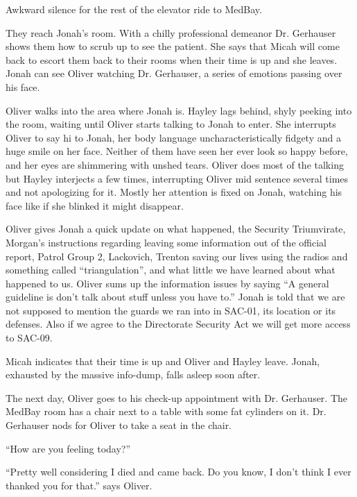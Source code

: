 Awkward silence for the rest of the elevator ride to MedBay.



They reach Jonah's room.  With a chilly professional demeanor Dr. Gerhauser shows them how to scrub up to see the patient.  She says that Micah will come back to escort them back to their rooms when their time is up and she leaves.  Jonah can see Oliver watching Dr. Gerhauser, a series of emotions passing over his face.



Oliver walks into the area where Jonah is.  Hayley lags behind, shyly peeking into the room, waiting until Oliver starts talking to Jonah to enter.  She interrupts Oliver to say hi to Jonah, her body language uncharacteristically fidgety and a huge smile on her face.  Neither of them have seen her ever look so happy before, and her eyes are shimmering with unshed tears.  Oliver does most of the talking but Hayley interjects a few times, interrupting Oliver mid sentence several times and not apologizing for it.  Mostly her attention is fixed on Jonah, watching his face like if she blinked it might disappear.



Oliver gives Jonah a quick update on what happened, the Security Triumvirate, Morgan's instructions regarding leaving some information out of the official report, Patrol Group 2, Lackovich, Trenton saving our lives using the radios and something called ``triangulation'', and what little we have learned about what happened to us.  Oliver sums up the information issues by saying ``A general guideline is don't talk about stuff unless you have to.''  Jonah is told that we are not supposed to mention the guards we ran into in SAC-01, its location or its defenses.  Also if we agree to the Directorate Security Act we will get more access to SAC-09. 



Micah indicates that their time is up and Oliver and Hayley leave.  Jonah, exhausted by the massive info-dump, falls asleep soon after.



The next day, Oliver goes to his check-up appointment with Dr. Gerhauser.  The MedBay room has a chair next to a table with some fat cylinders on it.  Dr. Gerhauser nods for Oliver to take a seat in the chair.

``How are you feeling today?''

``Pretty well considering I died and came back. Do you know, I don't think I ever thanked you for that.'' says Oliver.


